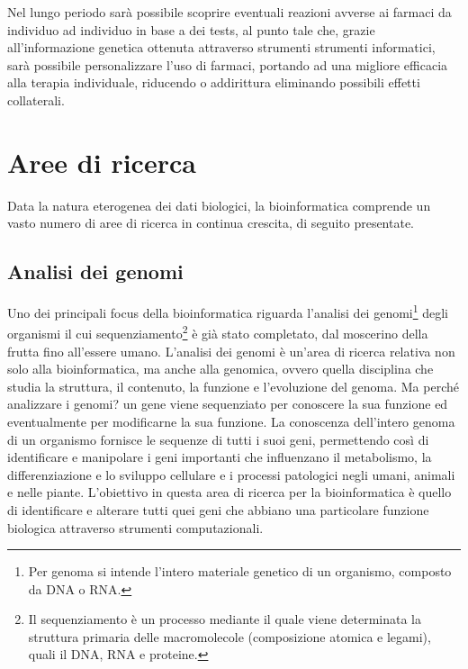 \newline
Nel lungo periodo sarà possibile scoprire eventuali reazioni avverse ai farmaci da individuo ad individuo in base a dei tests, al punto tale che, grazie all'informazione genetica ottenuta attraverso strumenti strumenti informatici, sarà possibile personalizzare l'uso di farmaci, portando ad una migliore efficacia alla terapia individuale, riducendo o addirittura eliminando possibili effetti collaterali.

\section{Aree di ricerca}
Data la natura eterogenea dei dati biologici, la bioinformatica comprende un vasto numero di aree di ricerca in continua crescita, di seguito presentate.

\subsection{Analisi dei genomi}
Uno dei principali focus della bioinformatica riguarda l'analisi dei genomi\footnote{Per genoma si intende l'intero materiale genetico di un organismo, composto da DNA o RNA.} degli organismi il cui sequenziamento\footnote{Il sequenziamento è un processo mediante il quale viene determinata la struttura primaria delle macromolecole (composizione atomica e legami), quali il DNA, RNA e proteine.} è già stato completato, dal moscerino della frutta fino all'essere umano. L'analisi dei genomi è un'area di ricerca relativa non solo alla bioinformatica, ma anche alla genomica, ovvero quella disciplina che studia la struttura, il contenuto, la funzione e l'evoluzione del genoma.
Ma perché analizzare i genomi? un gene viene sequenziato per conoscere la sua funzione ed eventualmente per modificarne la sua funzione. La conoscenza dell'intero genoma di un organismo fornisce le sequenze di tutti i suoi geni, permettendo così di identificare e manipolare i geni importanti che influenzano il metabolismo, la differenziazione e lo sviluppo cellulare e i processi patologici negli umani, animali e nelle piante.
\newline
L'obiettivo in questa area di ricerca per la bioinformatica è quello di identificare e alterare tutti quei geni che abbiano una particolare funzione biologica attraverso strumenti computazionali.

